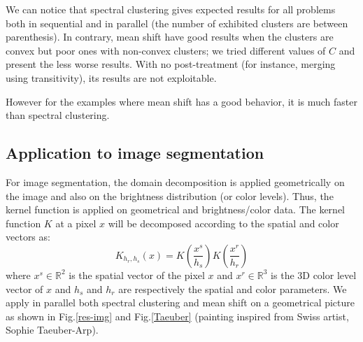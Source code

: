 \documentclass{llncs}
\begin{document}
We can notice that spectral clustering gives expected results for all
problems both in sequential and in parallel (the number of exhibited clusters
are between parenthesis). In contrary, mean shift have good
results when the clusters are convex but poor ones with non-convex clusters;
we tried different values of $C$ and present the less worse results.
With no post-treatment (for instance, merging using transitivity), its results
are not exploitable.

However for the examples where mean shift has a good behavior, it is much
faster than spectral clustering.

\subsection{Application to image segmentation}

For image segmentation, the domain decomposition is applied geometrically on
the image and also on the brightness distribution (or color
levels).
Thus, the kernel function is applied on geometrical and brightness/color data. The kernel function $K$ at a pixel $x$ will be decomposed according to the spatial and color vectors as:  
\begin{equation}
K_{h_r,h_s}(x)=K\left(\frac{x^s}{h_s}\right)K\left(\frac{x^r}{h_r}\right)
\end{equation}
where $x^s\in \mathbb{R}^2$ is the spatial vector of the pixel $x$ and $x^r \in \mathbb{R}^3$ is the 3D color level vector of $x$ and $h_s$ and $h_r$ are respectively the spatial and color parameters.
We apply in parallel both spectral clustering and mean shift on a geometrical
picture as shown in Fig.\ref{res-img} and Fig.\ref{Taeuber} (painting inspired from
Swiss artist, Sophie Taeuber-Arp).
\end{document}
